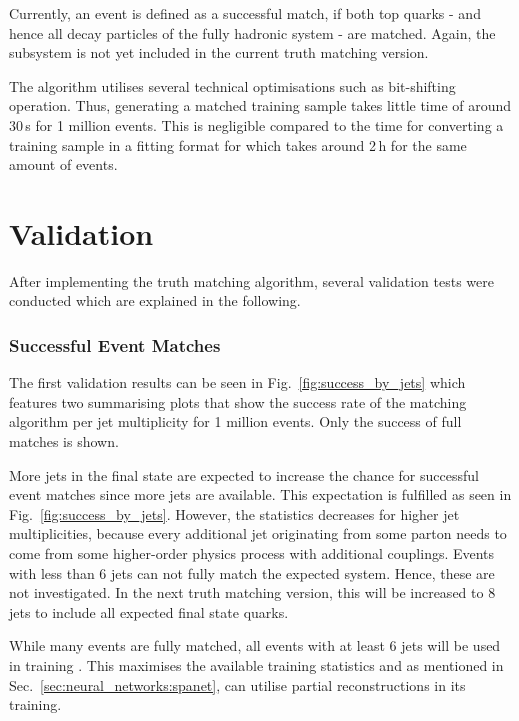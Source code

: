 \documentclass[bachelor,ngerman,english]{GAUBM}
\begin{document}
Currently, an event is defined as a successful match, if both top quarks - and hence all decay particles of the fully hadronic \ttbar system - are matched. Again, the \HWW subsystem is not yet included in the current truth matching version.

The algorithm utilises several technical optimisations such as bit-shifting operation. Thus, generating a matched training sample takes little time of around 30\,s for 1 million events. This is negligible compared to the time for converting a training sample in a fitting format for \spanet which takes around 2\,h for the same amount of events.

\section{Validation}
\label{sec:truth_matching:validation}
After implementing the truth matching algorithm, several validation tests were conducted which are explained in the following.

\subsubsection*{Successful Event Matches}
The first validation results can be seen in Fig.~\ref{fig:success_by_jets} which features two summarising plots that show the success rate of the matching algorithm per jet multiplicity for 1 million events. Only the success of full \ttbar matches is shown. 

More jets in the final state are expected to increase the chance for successful event matches since more jets are available. This expectation is fulfilled as seen in Fig.~\ref{fig:success_by_jets}. However, the statistics decreases for higher jet multiplicities, because every additional jet originating from some parton needs to come from some higher-order physics process with additional couplings. Events with less than 6 jets can not fully match the expected \ttbar system. Hence, these are not investigated. In the next truth matching version, this will be increased to 8 jets to include all expected final state quarks.

While many events are fully matched, all events with at least 6 jets will be used in training \spanet. This maximises the available training statistics and as mentioned in Sec.~\ref{sec:neural_networks:spanet}, \spanet can utilise partial reconstructions in its training. 
\end{document}
